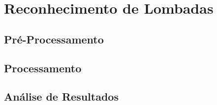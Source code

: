 \chapter{Reconhecimento de Lombadas}
\label{cap:deteccao_lombadas}

\section{Pré-Processamento}
\section{Processamento}
\section{Análise de Resultados}